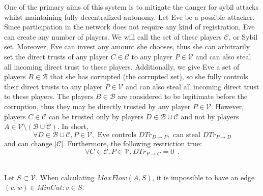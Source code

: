 \documentclass[11pt]{llncs}
\begin{document}
    One of the primary aims of this system is to mitigate the danger for sybil attacks whilst maintaining fully decentralized
    autonomy. Let Eve be a possible attacker. Since participation in the network does not require any kind of registration,
    Eve can create any number of players. We will call the set of these players $\mathcal{C}$, or Sybil set. Moreover, Eve
    can invest any amount she chooses, thus she can arbitrarily set the direct trusts of any player $C \in \mathcal{C}$ to
    any player $P \in \mathcal{V}$ and can also steal all incoming direct trust to these players. Additionally, we give Eve a
    set of players $B \in \mathcal{B}$ that she has corrupted (the corrupted set), so she fully controls their direct trusts
    to any player $P \in \mathcal{V}$ and can also steal all incoming direct trust to these players. The players $B \in
    \mathcal{B}$ are considered to be legitimate before the corruption, thus they may be directly trusted by any player $P
    \in \mathcal{V}$. However, players $C \in \mathcal{C}$ can be trusted only by players $D \in \mathcal{B} \cup
    \mathcal{C}$ and not by players $A \in \mathcal{V} \setminus (\mathcal{B} \cup \mathcal{C})$. In short,
    \begin{equation}
      \forall D \in \mathcal{B} \cup \mathcal{C}, P \in \mathcal{V}, \mbox{ Eve controls } DTr_{D \rightarrow P}, \mbox{ can
      steal } DTr_{P \rightarrow D}
    \end{equation}
    and can change $|\mathcal{C}|$. Furthermore, the following restriction true:
    \begin{equation}
       \forall C \in \mathcal{C}, P \in \mathcal{V}, DTr_{P \rightarrow C} = 0 \enspace.
    \end{equation}
    \begin{lemma} \ \\
       \label{mincutmany}
       Let $S \subset \mathcal{V}$. When calculating $MaxFlow\left(A, S\right)$, it is impossible to have an edge $\left(v,
       w\right) \in MinCut : v \in S$.
    \end{lemma}
\end{document}
